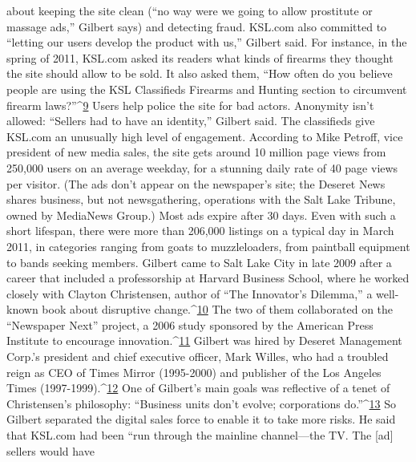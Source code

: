 about keeping the site clean (``no way were we going to allow prostitute or massage
ads,'' Gilbert says) and detecting fraud.
KSL.com also committed to ``letting our users develop the product with us,''
Gilbert said. For instance, in the spring of 2011, KSL.com asked its readers what
kinds of firearms they thought the site should allow to be sold. It also asked them,
``How often do you believe people are using the KSL Classifieds Firearms and
Hunting section to circumvent firearm laws?''^{\href{#endnotes-ch8}{9}} Users help police the site for bad
actors. Anonymity isn’t allowed: ``Sellers had to have an identity,'' Gilbert said.
The classifieds give KSL.com an unusually high level of engagement. According
to Mike Petroff, vice president of new media sales, the site gets around 10
million page views from 250,000 users on an average weekday, for a stunning
daily rate of 40 page views per visitor. (The ads don’t appear on the newspaper’s
site; the Deseret News shares business, but not newsgathering, operations with
the Salt Lake Tribune, owned by MediaNews Group.)
Most ads expire after 30 days. Even with such a short lifespan, there were more
than 206,000 listings on a typical day in March 2011, in categories ranging from
goats to muzzleloaders, from paintball equipment to bands seeking members.
Gilbert came to Salt Lake City in late 2009 after a career that included a professorship
at Harvard Business School, where he worked closely with Clayton
Christensen, author of ``The Innovator’s Dilemma,'' a well-known book about
disruptive change.^{\href{#endnotes-ch8}{10}} The two of them collaborated on the ``Newspaper Next''
project, a 2006 study sponsored by the American Press Institute to encourage
innovation.^{\href{#endnotes-ch8}{11}} Gilbert was hired by Deseret Management Corp.’s president and
chief executive officer, Mark Willes, who had a troubled reign as CEO of Times
Mirror (1995-2000) and publisher of the Los Angeles Times (1997-1999).^{\href{#endnotes-ch8}{12}}
One of Gilbert’s main goals was reflective of a tenet of Christensen’s philosophy:
``Business units don’t evolve; corporations do.''^{\href{#endnotes-ch8}{13}} So Gilbert separated
the digital sales force to enable it to take more risks. He said that KSL.com had
been ``run through the mainline channel—the TV. The [ad] sellers would have

